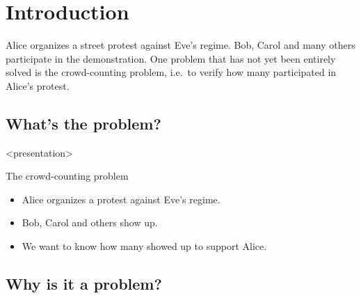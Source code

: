 \mode*

\section{Introduction}%
\label{Introduction}

Alice organizes a street protest against Eve's regime.
Bob, Carol and many others participate in the demonstration.
One problem that has not yet been entirely solved is the crowd-counting 
problem, i.e.\ to verify how many participated in Alice's protest.

\subsection<presentation>{What's the problem?}

\begin{frame}<presentation>
  \begin{block}{The crowd-counting problem}
    \begin{itemize}
      \item Alice organizes a protest against Eve's regime.
      \item Bob, Carol and others show up.
      \item We want to know how many showed up to support Alice.
    \end{itemize}
  \end{block}
\end{frame}

\subsection<presentation>{Why is it a problem?}


